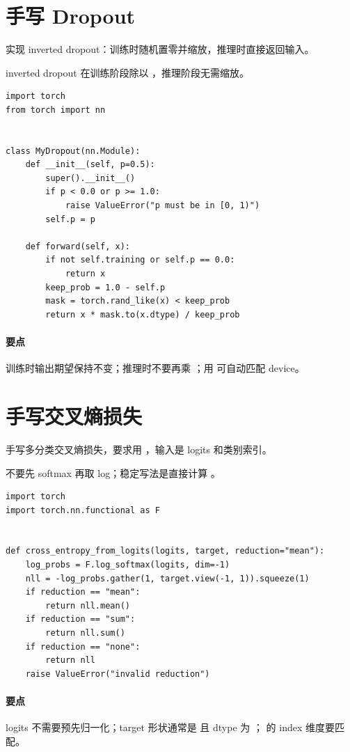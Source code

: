 \section{手写 Dropout}
\begin{interview}
实现 inverted dropout：训练时随机置零并缩放，推理时直接返回输入。
\end{interview}
\begin{answer}
inverted dropout 在训练阶段除以 ，推理阶段无需缩放。
\begin{lstlisting}
import torch
from torch import nn


class MyDropout(nn.Module):
    def __init__(self, p=0.5):
        super().__init__()
        if p < 0.0 or p >= 1.0:
            raise ValueError("p must be in [0, 1)")
        self.p = p

    def forward(self, x):
        if not self.training or self.p == 0.0:
            return x
        keep_prob = 1.0 - self.p
        mask = torch.rand_like(x) < keep_prob
        return x * mask.to(x.dtype) / keep_prob
\end{lstlisting}
\paragraph{要点} 训练时输出期望保持不变；推理时不要再乘 ；用  可自动匹配 device。
\end{answer}

\section{手写交叉熵损失}
\begin{interview}
手写多分类交叉熵损失，要求用 ，输入是 logits 和类别索引。
\end{interview}
\begin{answer}
不要先 softmax 再取 log；稳定写法是直接计算 。
\begin{lstlisting}
import torch
import torch.nn.functional as F


def cross_entropy_from_logits(logits, target, reduction="mean"):
    log_probs = F.log_softmax(logits, dim=-1)
    nll = -log_probs.gather(1, target.view(-1, 1)).squeeze(1)
    if reduction == "mean":
        return nll.mean()
    if reduction == "sum":
        return nll.sum()
    if reduction == "none":
        return nll
    raise ValueError("invalid reduction")
\end{lstlisting}
\paragraph{要点} logits 不需要预先归一化；target 形状通常是  且 dtype 为 ； 的 index 维度要匹配。
\end{answer}

